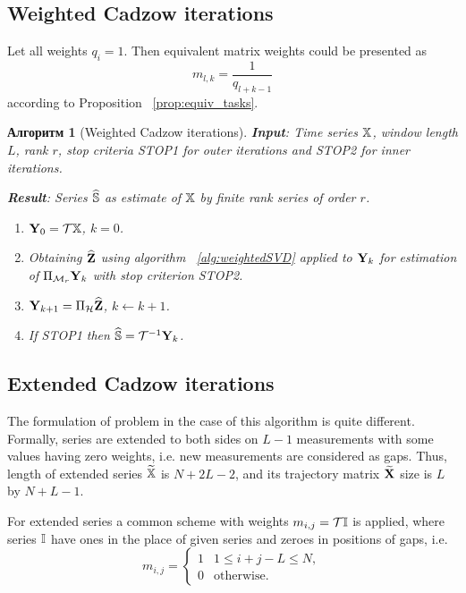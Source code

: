 \documentclass[12pt,a4paper,fleqn,leqno]{article}
\newtheorem{algorithm}{Алгоритм}
\begin{document}
\subsection{Weighted Cadzow iterations}

Let all weights $q_{i}=1$. Then equivalent matrix weights could be presented as
\begin{equation}
\label{Mw}
   m_{l, k} = \frac{1}{q_{l + k - 1}}
\end{equation}
according to Proposition ~\ref{prop:equiv_tasks}.

\begin{algorithm}[Weighted Cadzow iterations]
\textbf{Input}: Time series $\mathbb{X}$, window length $L$, rank $r$,
stop criteria STOP1 for outer iterations and STOP2 for inner iterations.

\textbf{Result}:
Series $\widehat{\mathbb{S}}$ as estimate of $\mathbb{X}$ by finite rank series of order $r$.

\begin{enumerate}
\item
$\mathbf{Y}_0 = \mathcal{T} \mathbb{X}$, $k=0$.
\item
Obtaining $\widehat{\mathbf{Z}}$ using algorithm ~\ref{alg:weightedSVD} applied to $\mathbf{Y}_k$ for estimation of $\Pi_{\mathcal{M}_r} \mathbf{Y}_{k}$ with stop criterion STOP2.
\item
$\mathbf{Y}_{k+1} = \Pi_{\mathcal{H}}  \widehat{\mathbf{Z}}$, $k\leftarrow k+1$.
\item
If STOP1 then $\widehat{\mathbb{S}} = \mathcal{T}^{-1} \mathbf{Y}_k$.
\end{enumerate}
\end{algorithm}

\subsection{Extended Cadzow iterations}

The formulation of problem in the case of this algorithm is quite different.
Formally, series are extended to both sides on $L-1$ measurements with some values having zero weights, i.e. new measurements are considered as gaps.
Thus, length of extended series $\widetilde{\mathbb{X}}$ is $N+2L-2$, and its trajectory matrix $\widetilde{\mathbf{X}}$ size is $L$ by $N+L-1$.

For extended series a common scheme with weights $m_{i,j}=\mathcal{T} \mathbb{I}$ is applied, where series $\mathbb{I}$ have ones in the place of given series and zeroes in positions of gaps, i.e.
\begin{equation*}
m_{i,j} = \begin{cases}
1 & 1 \le i+j-L \le N, \\
0 & \text{otherwise.}
\end{cases}
\end{equation*}
\end{document}
